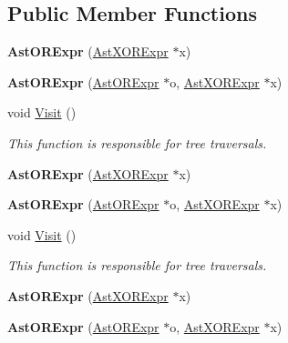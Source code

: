 \subsection*{Public Member Functions}
\begin{DoxyCompactItemize}
\item 
\hypertarget{classAstORExpr_a7e7557c1813587fa1a442cb7b5c5317c}{{\bfseries Ast\-O\-R\-Expr} (\hyperlink{classAstXORExpr}{Ast\-X\-O\-R\-Expr} $\ast$x)}\label{classAstORExpr_a7e7557c1813587fa1a442cb7b5c5317c}

\item 
\hypertarget{classAstORExpr_a928d0f31c99cd5d9eef962544465df7e}{{\bfseries Ast\-O\-R\-Expr} (\hyperlink{classAstORExpr}{Ast\-O\-R\-Expr} $\ast$o, \hyperlink{classAstXORExpr}{Ast\-X\-O\-R\-Expr} $\ast$x)}\label{classAstORExpr_a928d0f31c99cd5d9eef962544465df7e}

\item 
void \hyperlink{classAstORExpr_ac442067b01450413dca857727b3af8b3}{Visit} ()
\begin{DoxyCompactList}\small\item\em This function is responsible for tree traversals. \end{DoxyCompactList}\item 
\hypertarget{classAstORExpr_a7e7557c1813587fa1a442cb7b5c5317c}{{\bfseries Ast\-O\-R\-Expr} (\hyperlink{classAstXORExpr}{Ast\-X\-O\-R\-Expr} $\ast$x)}\label{classAstORExpr_a7e7557c1813587fa1a442cb7b5c5317c}

\item 
\hypertarget{classAstORExpr_a928d0f31c99cd5d9eef962544465df7e}{{\bfseries Ast\-O\-R\-Expr} (\hyperlink{classAstORExpr}{Ast\-O\-R\-Expr} $\ast$o, \hyperlink{classAstXORExpr}{Ast\-X\-O\-R\-Expr} $\ast$x)}\label{classAstORExpr_a928d0f31c99cd5d9eef962544465df7e}

\item 
void \hyperlink{classAstORExpr_ac442067b01450413dca857727b3af8b3}{Visit} ()
\begin{DoxyCompactList}\small\item\em This function is responsible for tree traversals. \end{DoxyCompactList}\item 
\hypertarget{classAstORExpr_a7e7557c1813587fa1a442cb7b5c5317c}{{\bfseries Ast\-O\-R\-Expr} (\hyperlink{classAstXORExpr}{Ast\-X\-O\-R\-Expr} $\ast$x)}\label{classAstORExpr_a7e7557c1813587fa1a442cb7b5c5317c}

\item 
\hypertarget{classAstORExpr_a928d0f31c99cd5d9eef962544465df7e}{{\bfseries Ast\-O\-R\-Expr} (\hyperlink{classAstORExpr}{Ast\-O\-R\-Expr} $\ast$o, \hyperlink{classAstXORExpr}{Ast\-X\-O\-R\-Expr} $\ast$x)}\label{classAstORExpr_a928d0f31c99cd5d9eef962544465df7e}


\end{DoxyCompactItemize}
